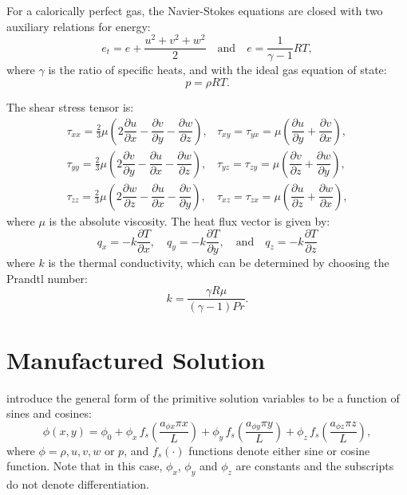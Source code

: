\documentclass[10pt]{article}
\newcommand{\diff}[2] {\dfrac{\partial #1}{\partial #2}}
\begin{document}
\begin{landscape}
For a calorically perfect gas, the Navier-Stokes equations are closed with two auxiliary relations for energy:
\begin{equation}
 \label{eq:ns2d_05}
e_t= e+\dfrac{u^2+v^2+w^2}{2} \quad \mbox{and}\quad e=\dfrac{1}{\gamma -1}RT ,
\end{equation}
where $\gamma$ is the ratio of specific heats, and with the ideal gas equation of state:
\begin{equation}
 \label{eq:ns2d_07}
p=\rho RT.
\end{equation}

The shear stress tensor is:
\begin{equation}
 \begin{array}{lll}
  \tau_{xx}= \frac{2}{3}  \mu \left( 2 \diff{u}{x} - \diff{v}{y} -\diff{w}{z} \right),
  &\tau_{xy}= \tau_{yx}=\mu \left( \diff{u}{y} + \diff{v}{x}\right),\\
  \tau_{yy}= \frac{2}{3}  \mu \left( 2 \diff{v}{y} - \diff{u}{x} -\diff{w}{z} \right),
  &\tau_{yz}= \tau_{zy}=\mu \left( \diff{v}{z} + \diff{w}{y}\right),\\
  \tau_{zz}= \frac{2}{3}  \mu \left( 2 \diff{w}{z} - \diff{u}{x} -\diff{v}{y} \right),
  &\tau_{xz}= \tau_{zx}=\mu \left( \diff{u}{z} + \diff{w}{x}\right),
 \end{array}
\end{equation}
where $\mu$ is the absolute viscosity. The heat flux vector is given by:
\begin{equation}
 q_x = - k \diff{T}{x}, \quad q_y = - k \diff{T}{y}, \quad \mbox{and} \quad q_z = - k \diff{T}{z}
 \end{equation}
where $k$ is the thermal conductivity, which can be determined by choosing the Prandtl number:
$$k= \dfrac{\gamma R \mu}{ (\gamma-1) Pr}.$$



 

\section{Manufactured Solution}

\citet{Roy2002} introduce the general form of the primitive solution variables to be  a function of sines and cosines:
\begin{equation}
 \label{eq:manufactured01}
  \phi (x,y) = \phi_0+ \phi_x\, f_s \left(\frac{a_{\phi x} \pi x}{L} \right) +  \phi_y \,f_s\left(\frac{a_{\phi y} \pi y}{L}\right) + \phi_z \,f_s\left(\frac{a_{\phi z} \pi z}{L}\right),
\end{equation}
where $\phi=\rho,u,v,w$ or $p$, and $f_s(\cdot)$ functions denote either sine or cosine function. Note that in this case, $\phi_x$, $\phi_y$ and $\phi_z$ are constants  and the subscripts do not denote differentiation.


\end{landscape}
\end{document}
